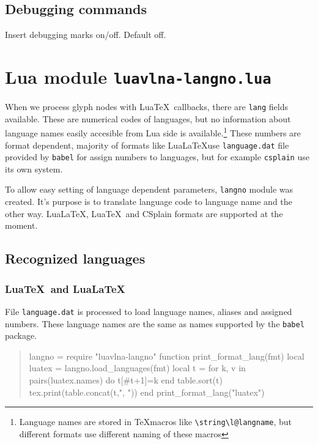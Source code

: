 \documentclass[12pt]{ltxdoc}
\newenvironment{mycode}{
	\medskip%
	\parindent=0pt%
}{\medskip}
\begin{document}
\subsection{Debugging commands}
\begin{mycode}
\cmd{\preventsingledebugon}\par
\cmd{\preventsingledebugoff}
\end{mycode}

Insert debugging marks on/off. Default off.

\section{Lua module \texttt{luavlna-langno.lua}}

When we process glyph nodes with Lua\TeX\ callbacks, there are \verb|lang| 
fields available. These are numerical codes of languages, but no information
about language names easily accesible from Lua side is available.\footnote{%
	Language names are stored in \TeX macros like \verb|\string\l@langname|, but 
	different formats use different naming of these macros}
These numbers are format dependent, majority of formats like 
Lua\LaTeX use \verb|language.dat| file provided by \verb|babel| 
for assign numbers to languages, but for example \verb|csplain| 
use its own system.

To allow easy setting of language dependent parameters, \verb|langno| module 
was created. It's purpose is to translate language code to language name and 
the other way. Lua\LaTeX, Lua\TeX\ and CSplain formats are supported at the moment.

\subsection{Recognized languages}
\subsubsection{Lua\TeX\ and Lua\LaTeX}

File \verb|language.dat| is processed to load language names, aliases and assigned numbers. These language names are the same as names supported by the \verb|babel| package.

\begin{quotation}
  \small\noindent
\begin{luacode*}
  langno = require "luavlna-langno"
  function print_format_lang(fmt)
    local luatex = langno.load_languages(fmt)
    local t = {}
    for k, v in pairs(luatex.names) do
      t[#t+1]=k
    end
    table.sort(t)
    tex.print(table.concat(t,", "))
  end
  print_format_lang("luatex")
\end{luacode*}
\end{quotation}
\end{document}

